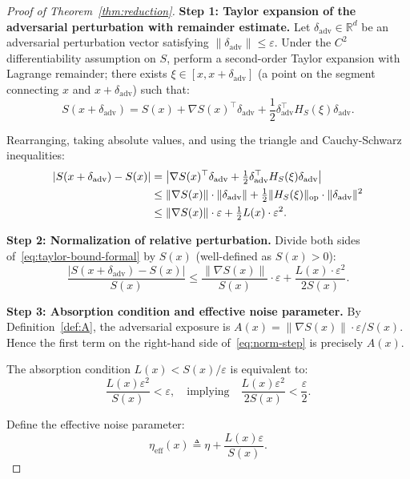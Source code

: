 \documentclass[12pt,a4paper]{article}
\newcommand{\R}{\mathbb{R}}
\newcommand{\op}{\mathrm{op}}
\newcommand{\adv}{\mathrm{adv}}
\newcommand{\eff}{\mathrm{eff}}
\begin{document}
\begin{proof}[Proof of Theorem~\ref{thm:reduction}]

\textbf{Step 1: Taylor expansion of the adversarial perturbation with remainder estimate.}
Let $\delta_{\adv} \in \R^d$ be an adversarial perturbation vector satisfying $\|\delta_{\adv}\| \leq \varepsilon$. Under the $C^2$ differentiability assumption on $S$, perform a second-order Taylor expansion with Lagrange remainder; there exists $\xi \in [x, x+\delta_{\adv}]$ (a point on the segment connecting $x$ and $x+\delta_{\adv}$) such that:
\begin{equation}\label{eq:formal-taylor}
S(x+\delta_{\adv}) = S(x) + \nabla S(x)^\top \delta_{\adv} + \frac12 \delta_{\adv}^\top H_S(\xi) \delta_{\adv}.
\end{equation}

Rearranging, taking absolute values, and using the triangle and Cauchy-Schwarz inequalities:
\begin{align}
|S(x+\delta_{\adv}) - S(x)|
&= \bigl| \nabla S(x)^\top \delta_{\adv} + \tfrac12 \delta_{\adv}^\top H_S(\xi) \delta_{\adv} \bigr| \notag \\
&\leq \|\nabla S(x)\| \cdot \|\delta_{\adv}\| + \tfrac12 \|H_S(\xi)\|_{\op} \cdot \|\delta_{\adv}\|^2 \label{eq:taylor-cs} \\
&\leq \|\nabla S(x)\| \cdot \varepsilon + \tfrac12 L(x) \cdot \varepsilon^2. \label{eq:taylor-bound-formal}
\end{align}

\textbf{Step 2: Normalization of relative perturbation.}
Divide both sides of~\eqref{eq:taylor-bound-formal} by $S(x)$ (well-defined as $S(x) > 0$):
\begin{equation}\label{eq:norm-step}
\frac{|S(x+\delta_{\adv}) - S(x)|}{S(x)}
\leq \frac{\|\nabla S(x)\|}{S(x)} \cdot \varepsilon
    + \frac{L(x) \cdot \varepsilon^2}{2 S(x)}.
\end{equation}

\textbf{Step 3: Absorption condition and effective noise parameter.}
By Definition~\ref{def:A}, the adversarial exposure is $A(x) = \|\nabla S(x)\| \cdot \varepsilon / S(x)$. Hence the first term on the right-hand side of~\eqref{eq:norm-step} is precisely $A(x)$.

The absorption condition $L(x) < S(x)/\varepsilon$ is equivalent to:
\[
\frac{L(x) \varepsilon^2}{S(x)} < \varepsilon,
\quad\text{implying}\quad
\frac{L(x) \varepsilon^2}{2 S(x)} < \frac{\varepsilon}{2}.
\]

Define the effective noise parameter:
\[
\eta_{\eff}(x) \triangleq \eta + \frac{L(x) \varepsilon}{S(x)}.
\]


\end{proof}
\end{document}
